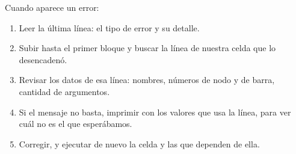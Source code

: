 \begin{estrategia}
Cuando aparece un error:
\begin{enumerate}
  \item Leer la última línea: el tipo de error y su detalle.
  \item Subir hasta el primer bloque y buscar la línea de nuestra celda que
    lo desencadenó.
  \item Revisar los datos de esa línea: nombres, números de nodo y de barra,
    cantidad de argumentos.
  \item Si el mensaje no basta, imprimir con  los valores que usa
    la línea, para ver cuál no es el que esperábamos.
  \item Corregir, y ejecutar de nuevo la celda y las que dependen de ella.
\end{enumerate}
\end{estrategia}

